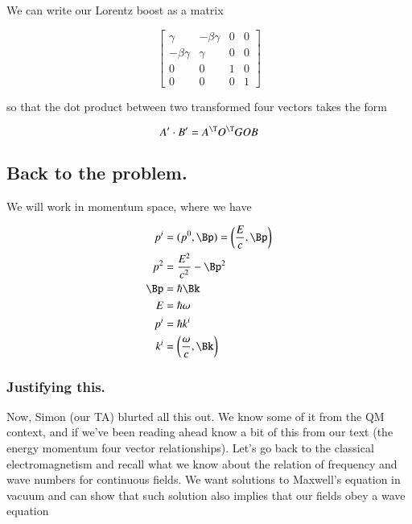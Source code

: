 We can write our Lorentz boost as a matrix

\begin{equation}\label{eqn:relativisticElectrodynamicsT1:110}
\begin{bmatrix}
\gamma & -\beta \gamma & 0 & 0 \\
-\beta \gamma & \gamma & 0 & 0 \\
0 & 0 & 1 & 0 \\
0 & 0 & 0 & 1 
\end{bmatrix}
\end{equation}

so that the dot product between two transformed four vectors takes the form

\begin{equation}\label{eqn:relativisticElectrodynamicsT1:120}
A' \cdot B' = A^\T O^\T G O B
\end{equation}

\subsection{Back to the problem.}

We will work in momentum space, where we have

\begin{align}\label{eqn:relativisticElectrodynamicsT1:130}
p^i &= (p^0, \Bp) = \left( \frac{E}{c}, \Bp\right) \\
p^2 &= \frac{E^2}{c^2} -\Bp^2 \\
\Bp &= \hbar \Bk \\
E &= \hbar \omega \\
p^i &= \hbar k^i \\
k^i &= \left(\frac{\omega}{c}, \Bk\right)
\end{align}

\subsubsection{Justifying this.}

Now, Simon (our TA) blurted all this out.  We know some of it from the QM context, and if we've been reading ahead know a bit of this from our text \cite{landau1980classical} (the energy momentum four vector relationships).  Let's go back to the classical electromagnetism and recall what we know about the relation of frequency and wave numbers for continuous fields.  We want solutions to Maxwell's equation in vacuum and can show that such solution also implies that our fields obey a wave equation

